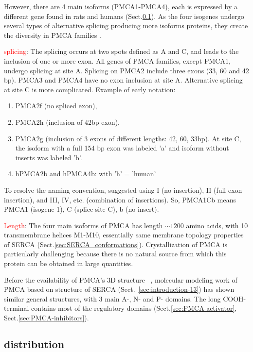 However, there are 4 main isoforms (PMCA1-PMCA4), each is expressed by a
different gene found in rats and humans (Sect.\ref{sec:PMCA-distribution}). As
the four isogenes undergo several types of alternative splicing producing more
isoforms proteins, they create the diversity in PMCA families
\citep{strehler2001}.
  

\textcolor{red}{splicing}: The splicing occurs at two spots defined as A and C,
and leads to the inclusion of one or more exon.  All genes of PMCA families,
except PMCA1, undergo splicing at site A. Splicing on PMCA2 include three exons
(33, 60 and 42 bp). PMCA3 and PMCA4 have no exon inclusion at site A.
Alternative splicing at site C is more complicated.
Example of early notation:
\begin{enumerate}
  \item PMCA2f (no spliced exon), 
  
  \item PMCA2h (inclusion of 42bp exon), 
  
  \item PMCA2g (inclusion of 3 exons of different lengths: 42, 60, 33bp). At
  site C, the isoform with a full 154 bp exon was labeled 'a' and isoform without inserts was labeled 'b'.
  
  \item hPMCA2b and hPMCA4b: with 'h' = 'human' 
\end{enumerate}
To resolve the naming convention, \citep{carafoli1994} suggested using I (no
insertion), II (full exon insertion), and III, IV, etc. (combination of
insertions).  So, PMCA1Cb means PMCA1 (isogene 1), C (splice site C), b (no
insert). 


\textcolor{red}{Length}: The four main isoforms of PMCA has length  $\sim 1200$
amino acids, with 10 transmembrane helices M1-M10, essentially same membrane
topology properties of SERCA (Sect.\ref{sec:SERCA_conformations}).
Crystallization of PMCA is particularly challenging because there is no natural
source from which this protein can be obtained in large quantities.

Before the evailability of PMCA's 3D structure ~\citep{carafoli1994}, molecular
modeling work of PMCA based on structure of SERCA
(Sect.~\ref{sec:introduction-13}) has shown similar general structures, with 3
main A-, N- and P- domains. The long COOH-terminal contains most of the
regulatory domains (Sect.\ref{sec:PMCA-activator}, Sect.\ref{sec:PMCA-inhibitors}).

\subsection{distribution}
\label{sec:PMCA-distribution}

